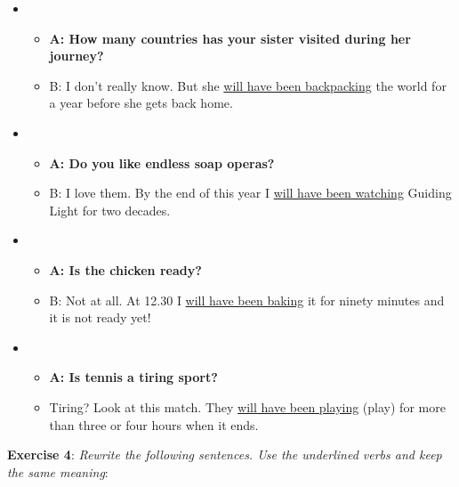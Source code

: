 \begin{itemize}
\item
\begin{itemize}
\item\textbf{A: How many countries has your sister visited during her journey?}
\item B: I don't really know. But she \underline{will have been backpacking} the world for a year before she gets back home. 
\end{itemize}

\item
\begin{itemize}
\item\textbf{A: Do you like endless soap operas?}
\item B: I love them. By the end of this year I \underline{will have been watching} Guiding Light for two decades. 
\end{itemize}

\item
\begin{itemize}
\item\textbf{A: Is the chicken ready?}
\item B: Not at all. At 12.30 I \underline{will have been baking}  it for ninety minutes and it is not ready yet! 
\end{itemize}

\item
\begin{itemize}
\item\textbf{A: Is tennis a tiring sport?}
\item Tiring? Look at this match. They \underline{will have been playing} (play) for more than three or four hours when it ends. 
\end{itemize}

\end{itemize}

\textbf{Exercise 4}: \textit{Rewrite the following sentences. Use the underlined verbs and keep the same meaning}:

